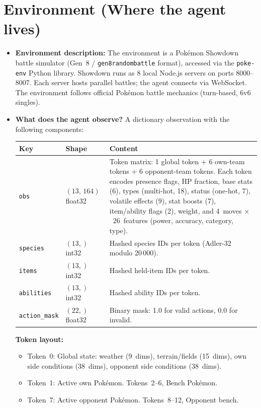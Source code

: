 \documentclass[11pt, a4paper]{article}
\begin{document}
\section{Environment (Where the agent lives)}
\begin{itemize}
    \item \textbf{Environment description:}
        The environment is a Pok\'{e}mon Showdown battle simulator (Gen~8 / \texttt{gen8randombattle} format), accessed via the \texttt{poke-env} Python library. Showdown runs as 8 local Node.js servers on ports 8000--8007. Each server hosts parallel battles; the agent connects via WebSocket. The environment follows official Pok\'{e}mon battle mechanics (turn-based, 6v6 singles).

    \item \textbf{What does the agent observe?}
        A dictionary observation with the following components:

        \begin{center}
        \small
        \begin{tabularx}{\textwidth}{l l X}
            \toprule
            \textbf{Key} & \textbf{Shape} & \textbf{Content} \\
            \midrule
            \texttt{obs}           & $(13,\, 164)$ float32  & Token matrix: 1 global token + 6 own-team tokens + 6 opponent-team tokens. Each token encodes presence flags, HP fraction, base stats (6), types (multi-hot, 18), status (one-hot, 7), volatile effects (9), stat boosts (7), item/ability flags (2), weight, and 4~moves $\times$~26~features (power, accuracy, category, type). \\
            \texttt{species}       & $(13,)$ int32          & Hashed species IDs per token (Adler-32 modulo 20\,000). \\
            \texttt{items}         & $(13,)$ int32          & Hashed held-item IDs per token. \\
            \texttt{abilities}     & $(13,)$ int32          & Hashed ability IDs per token. \\
            \texttt{action\_mask}  & $(22,)$ float32        & Binary mask: 1.0 for valid actions, 0.0 for invalid. \\
            \bottomrule
        \end{tabularx}
        \end{center}

        \textbf{Token layout:}
        \begin{itemize}
            \item Token~0: Global state: weather (9~dims), terrain/fields (15~dims), own side conditions (38~dims), opponent side conditions (38~dims).
            \item Token~1: Active own Pok\'{e}mon. Tokens~2--6, Bench Pok\'{e}mon.
            \item Token~7: Active opponent Pok\'{e}mon. Tokens~8--12, Opponent bench.
        \end{itemize}


\end{itemize}
\end{document}
